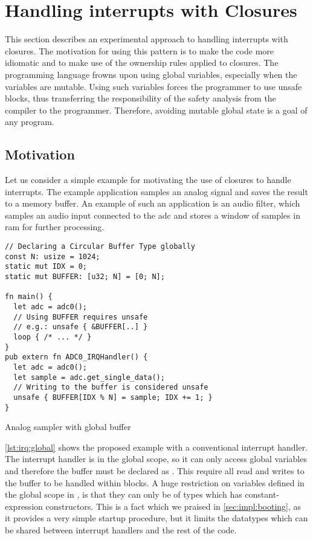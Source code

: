 \section{Handling interrupts with Closures}
\label{sec:irq-closures}

This section describes an experimental approach to handling interrupts with closures.
The motivation for using this pattern is to make the code more {\rust} idiomatic and to make use of the ownership rules applied to closures.
The {\rust} programming language frowns upon using global variables, especially when the variables are mutable.
Using such variables forces the programmer to use unsafe blocks, thus transferring the responsibility of the safety analysis from the compiler to the programmer.
Therefore, avoiding mutable global state is a goal of any {\rust} program.

\subsection{Motivation}
\label{sec:irq:motivation}

Let us consider a simple example for motivating the use of closures to handle interrupts.
The example application samples an analog signal and saves the result to a memory buffer.
An example of such an application is an audio filter, which samples an audio input connected to the \gls{adc} and stores a window of samples in \gls{ram} for further processing.

\begin{listing}[H]
  \begin{verbatim}
// Declaring a Circular Buffer Type globally
const N: usize = 1024;
static mut IDX = 0;
static mut BUFFER: [u32; N] = [0; N];

fn main() {
  let adc = adc0();
  // Using BUFFER requires unsafe
  // e.g.: unsafe { &BUFFER[..] }
  loop { /* ... */ }
}
pub extern fn ADC0_IRQHandler() {
  let adc = adc0();
  let sample = adc.get_single_data();
  // Writing to the buffer is considered unsafe
  unsafe { BUFFER[IDX % N] = sample; IDX += 1; }
}
  \end{verbatim}
  \caption{Analog sampler with global buffer}
  \label{lst:irq:global}
\end{listing}

\autoref{lst:irq:global} shows the proposed example with a conventional interrupt handler.
The interrupt handler is in the global scope, so it can only access global variables and therefore the buffer must be declared as .
This require all read and writes to the buffer to be handled within  blocks.
A huge restriction on variables defined in the global scope in {\rust}, is that they can only be of types which has constant-expression constructors.
This is a fact which we praised in \autoref{sec:impl:booting}, as it provides a very simple startup procedure, but it limits the datatypes which can be shared between interrupt handlers and the rest of the code.

